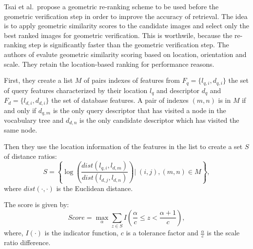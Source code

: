 Tsai et al.\ propose a geometric re-ranking scheme \cite{tsai2010fast} to be used before the geometric verification step in order to improve the accuracy of retrieval. The idea is to apply geometric similarity scores to the candidate images and select only the best ranked images for geometric verification. This is worthwile, because the re-ranking step is significantly faster than the geometric verification step. The authors of \cite{tsai2010fast} evalute geometric similarity scoring based on location, orientation and scale. They retain the location-based ranking for performance reasons.

First, they create a list $M$ of pairs indexes of features from $F_q = \{ l_{q,i}, d_{q,i}\}$ the set of query features characterized by their location $l_q$ and descriptor $d_q$ and $F_d = \{ l_{d,i}, d_{d,i}\}$ the set of database features. A pair of indexes $(m,n)$ is in $M$ if and only if $d_{q,m}$ is the only query descriptor that has visited a node in the vocabulary tree and $d_{d,n}$ is the only candidate descriptor which has visited the same node.

Then they use the location information of the features in the list to create a set $S$ of distance ratios:
\begin{equation}
    S = \left\{ \log \left( \frac{dist(l_{q,i},l_{d,m})}{dist(l_{d,j},l_{d,n})} \right) \big| \; (i,j),(m,n) \in M \right\},
\end{equation}
where $dist(\cdot,\cdot)$ is the Euclidean distance.

The score is given by:
\begin{equation}
    Score = \underset{\alpha}{\max} \sum_{z \in S} I\left( \frac{\alpha}{c} \leq z < \frac{\alpha + 1}{c} \right),
\end{equation}
where, $I(\cdot)$ is the indicator function, $c$ is a tolerance factor and $\frac{\alpha}{c}$ is the scale ratio difference.
